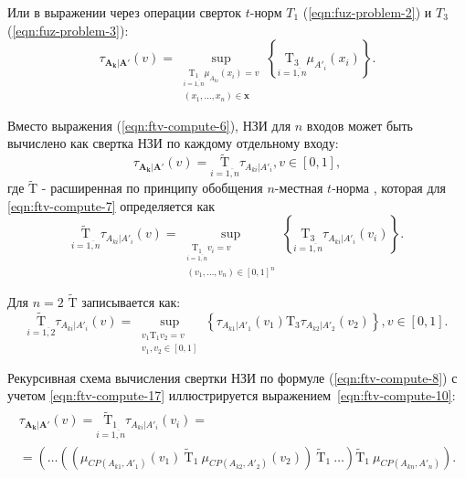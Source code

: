 Или в выражении через операции сверток $t$-норм $T_1$ (\ref{eqn:fuz-problem-2}) и $T_3$ (\ref{eqn:fuz-problem-3}):
\begin{equation}
	\label{eqn:ftv-compute-6}
	\tau_{\mathbf{A_k}|\mathbf{A'}}(v) = \sup_{\substack{\underset{i=\overline{1,n}}{\mathrm{T_1}}\mu_{A_{ki}}(x_i)=v \\ (x_1, \dots, x_n) \in \mathbf{x}}} \left\{ \underset{i=\overline{1,n}}{\mathrm{T_3}} \mu_{A'_i}(x_i) \right\}.
\end{equation}

Вместо выражения (\ref{eqn:ftv-compute-6}), НЗИ для $n$ входов может быть вычислено как свертка НЗИ по каждому отдельному входу:
\begin{equation}
	\label{eqn:ftv-compute-7}
	\tau_{\mathbf{A_k}|\mathbf{A'}}(v) = \underset{i=\overline{1,n}}{\mathrm{\tilde{T}}} \tau_{A_{ki}|A'_i}, v \in [0, 1],
\end{equation}
где $\mathrm{\tilde{T}}$ - расширенная по принципу обобщения $n$-местная $t$-норма \cite{kutsenko2015methods}, которая для \eqref{eqn:ftv-compute-7} определяется как
\begin{equation}
	\label{eqn:ftv-compute-8}
	\underset{i=\overline{1,n}}{\mathrm{\tilde{T}}} \tau_{A_{ki}|A'_i}(v) = \sup_{\substack{\underset{i=\overline{1,n}}{\mathrm{T_1}}v_i = v \\ (v_1, \dots, v_n) \in [0, 1]^n}} \left\{\underset{i=\overline{1,n}}{\mathrm{T_3}}\tau_{A_{ki}|A'_i}(v_i)\right\}.
\end{equation}

Для $n=2$ $\mathrm{\tilde{T}}$ записывается как:
\begin{equation}
\label{eqn:ftv-compute-17}
\underset{i=\overline{1,2}}{\mathrm{\tilde{T}}} \tau_{A_{ki}|A'_i}(v) = \sup_{\substack{v_1 \mathrm{ T_1 } v_2 = v \\ v_1, v_2 \in [0, 1]}} \left\{ \tau_{A_{k1}|A'_1}(v_1) \mathrm{ T_3 } \tau_{A_{k2}|A'_2}(v_2) \right\}, v \in [0,1].
\end{equation}

Рекурсивная схема вычисления свертки НЗИ по формуле (\ref{eqn:ftv-compute-8}) с учетом \eqref{eqn:ftv-compute-17} иллюстрируется выражением~\eqref{eqn:ftv-compute-10}:
\begin{gather}
	\label{eqn:ftv-compute-10}
	\begin{gathered}
	\tau_{\mathbf{A_k}|\mathbf{A'}}(v) = \underset{i=\overline{1,n}}{\mathrm{\tilde{T}_1}}\tau_{A_{ki}|A'_i}(v_i) = \\
	= \left(\dots\left(\left(\mu_{CP(A_{k1}, A'_1)}(v_1)\ \mathrm{\tilde{T}_1}\ \mu_{CP(A_{k2}, A'_2)}(v_2)\right)\ \mathrm{\tilde{T}_1}\ \dots \right) \mathrm{\tilde{T}_1}\ \mu_{CP(A_{kn}, A'_n)}\right).
	\end{gathered}
\end{gather}

